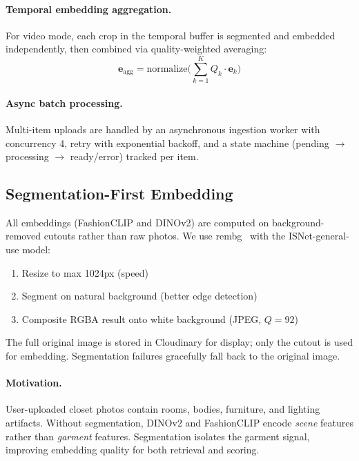 \documentclass[10pt,twocolumn]{article}
\begin{document}
\paragraph{Temporal embedding aggregation.}
For video mode, each crop in the temporal buffer is segmented and embedded
independently, then combined via quality-weighted averaging:
\begin{equation}
  \mathbf{e}_{\text{agg}} = \text{normalize}\bigg(
    \sum_{k=1}^{K} Q_k \cdot \mathbf{e}_k
  \bigg)
\end{equation}

\paragraph{Async batch processing.}
Multi-item uploads are handled by an asynchronous ingestion worker with
concurrency 4, retry with exponential backoff, and a state machine
(pending $\to$ processing $\to$ ready/error) tracked per item.

\subsection{Segmentation-First Embedding}
\label{sec:segmentation}

All embeddings (FashionCLIP and DINOv2) are computed on
background-removed cutouts rather than raw photos.  We use
rembg~\citep{rembg} with the ISNet-general-use model:

\begin{enumerate}[leftmargin=*,topsep=2pt,itemsep=1pt]
\item Resize to max 1024px (speed)
\item Segment on natural background (better edge detection)
\item Composite RGBA result onto white background (JPEG, $Q{=}92$)
\end{enumerate}

The full original image is stored in Cloudinary for display; only the
cutout is used for embedding.  Segmentation failures gracefully fall back
to the original image.

\paragraph{Motivation.}
User-uploaded closet photos contain rooms, bodies, furniture, and
lighting artifacts.  Without segmentation, DINOv2 and FashionCLIP encode
\emph{scene} features rather than \emph{garment} features.  Segmentation
isolates the garment signal, improving embedding quality for both
retrieval and scoring.
\end{document}
